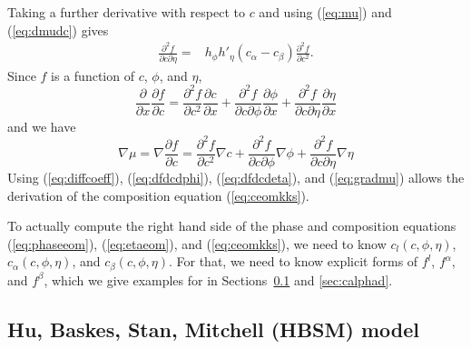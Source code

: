 Taking a further derivative with respect to $c$ and using 
(\ref{eq:mu}) and (\ref{eq:dmudc}) gives
%
\begin{equation}
\begin{split}
  \frac{\partial^2 f}{\partial c \partial \eta} = {}
  & h_\phi h'_\eta ( c_\alpha - c_\beta ) 
    \frac{\partial^2 f}{\partial c^2}.
\label{eq:dfdcdeta}
\end{split}
\end{equation}
%
Since $f$ is a function of $c$, $\phi$, and $\eta$,
%
\begin{equation}
  \frac{\partial}{\partial x}\frac{\partial f}{\partial c} =
  \frac{\partial^2 f}{\partial c^2}\frac{\partial c}{\partial x} +
  \frac{\partial^2 f}{\partial c
  \partial \phi}\frac{\partial \phi}{\partial x} +
  \frac{\partial^2 f}{\partial c
  \partial \eta}\frac{\partial \eta}{\partial x}
\end{equation}
%
and we have
%
\begin{equation}
  \nabla\mu = \nabla\frac{\partial f}{\partial c} =
  \frac{\partial^2 f}{\partial c^2} \nabla c +
  \frac{\partial^2 f}{\partial c\partial\phi} \nabla \phi +
  \frac{\partial^2 f}{\partial c\partial\eta} \nabla \eta
\label{eq:gradmu}
\end{equation}
%
Using (\ref{eq:diffcoeff}), (\ref{eq:dfdcdphi}), (\ref{eq:dfdcdeta}),
and (\ref{eq:gradmu}) allows the derivation of the composition
equation (\ref{eq:ceomkks}).

To actually compute the right hand side of the phase and composition
equations (\ref{eq:phaseeom}), (\ref{eq:etaeom}), and
(\ref{eq:ceomkks}), we need to know $c_l(c,\phi,\eta)$,
$c_\alpha(c,\phi,\eta)$, and $c_\beta(c,\phi,\eta)$.  For that, we
need to know explicit forms of $f^l$, $f^\alpha$, and $f^\beta$, which
we give examples for in Sections~\ref{sec:hbsm} and \ref{sec:calphad}.

%
\subsection{Hu, Baskes, Stan, Mitchell (HBSM) model}
\label{sec:hbsm}

